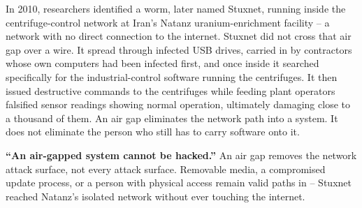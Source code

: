 \begin{example}
In 2010, researchers identified a worm, later named Stuxnet, running inside the centrifuge-control
network at Iran's Natanz uranium-enrichment facility -- a network with no direct connection to the
internet. Stuxnet did not cross that air gap over a wire. It spread through
infected USB drives, carried in by contractors whose own computers had been infected first, and
once inside it searched specifically for the industrial-control software running the centrifuges.
It then issued destructive commands to the centrifuges while feeding plant operators falsified
sensor readings showing normal operation, ultimately damaging close to a thousand of
them. An air gap eliminates the network path into a system. It does not eliminate
the person who still has to carry software onto it.
\end{example}

\begin{misconception}
\textbf{``An air-gapped system cannot be hacked.''} An air gap removes the network attack surface,
not every attack surface. Removable media, a compromised update process, or a person with physical
access remain valid paths in -- Stuxnet reached Natanz's isolated network without ever touching the
internet.
\end{misconception}

